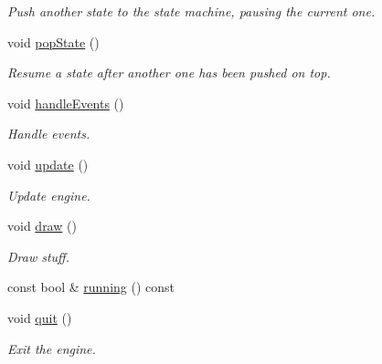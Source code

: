 \begin{DoxyCompactItemize}
\begin{DoxyCompactList}\small\item\em Push another state to the state machine, pausing the current one. \end{DoxyCompactList}\item 
\hypertarget{class_engine_a65f4afabccdbc04c11beab562dd77d53}{void \hyperlink{class_engine_a65f4afabccdbc04c11beab562dd77d53}{pop\-State} ()}\label{class_engine_a65f4afabccdbc04c11beab562dd77d53}

\begin{DoxyCompactList}\small\item\em Resume a state after another one has been pushed on top. \end{DoxyCompactList}\item 
\hypertarget{class_engine_ad1e8214e8ca9f436d27a7246dd908d9c}{void \hyperlink{class_engine_ad1e8214e8ca9f436d27a7246dd908d9c}{handle\-Events} ()}\label{class_engine_ad1e8214e8ca9f436d27a7246dd908d9c}

\begin{DoxyCompactList}\small\item\em Handle events. \end{DoxyCompactList}\item 
\hypertarget{class_engine_ad2ff110d5a86c1cd60b541d65915ac48}{void \hyperlink{class_engine_ad2ff110d5a86c1cd60b541d65915ac48}{update} ()}\label{class_engine_ad2ff110d5a86c1cd60b541d65915ac48}

\begin{DoxyCompactList}\small\item\em Update engine. \end{DoxyCompactList}\item 
\hypertarget{class_engine_a1b654dc41dfbcb5072147f33142b726e}{void \hyperlink{class_engine_a1b654dc41dfbcb5072147f33142b726e}{draw} ()}\label{class_engine_a1b654dc41dfbcb5072147f33142b726e}

\begin{DoxyCompactList}\small\item\em Draw stuff. \end{DoxyCompactList}\item 
const bool \& \hyperlink{class_engine_a06d23c7cf9fa2242c84b902d4960fcf4}{running} () const 
\item 
\hypertarget{class_engine_abd6e5ae9f755e283f4cc6b69ab24c582}{void \hyperlink{class_engine_abd6e5ae9f755e283f4cc6b69ab24c582}{quit} ()}\label{class_engine_abd6e5ae9f755e283f4cc6b69ab24c582}

\begin{DoxyCompactList}\small\item\em Exit the engine. \end{DoxyCompactList}\end{DoxyCompactItemize}

